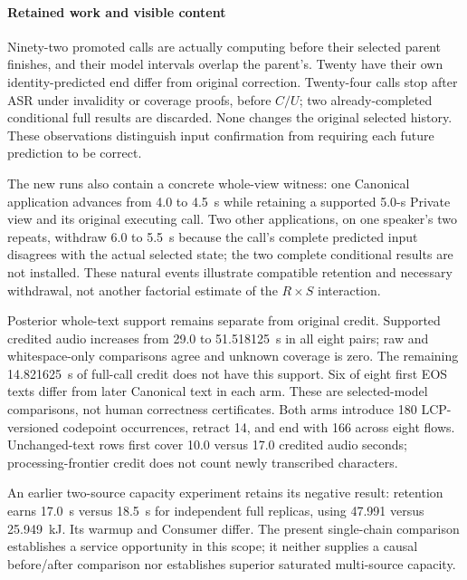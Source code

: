 \paragraph{Retained work and visible content}
Ninety-two promoted calls are actually computing before their selected
parent finishes, and their model intervals overlap the parent's. Twenty
have their own identity-predicted end differ from original correction.
Twenty-four calls stop after ASR under invalidity or coverage proofs,
before $C/U$; two
already-completed conditional full results are discarded. None changes
the original selected history. These observations distinguish input
confirmation from requiring each future prediction to be correct.

The new runs also contain a concrete whole-view witness: one Canonical
application advances from 4.0 to 4.5~s while retaining a supported 5.0-s
Private view and its original executing call. Two other applications,
on one speaker's two repeats, withdraw 6.0 to 5.5~s because the call's
complete predicted input disagrees with the actual selected state;
the two complete conditional results are not installed. These natural
events illustrate compatible retention and necessary withdrawal, not
another factorial estimate of the $R\times S$ interaction.

Posterior whole-text support remains separate from original credit.
Supported credited audio increases from 29.0 to 51.518125~s in all eight
pairs; raw and whitespace-only comparisons agree and unknown coverage
is zero. The remaining 14.821625~s of full-call credit does not have this
support. Six of eight first EOS texts differ from later Canonical text
in each arm. These are selected-model comparisons, not human correctness
certificates. Both arms introduce 180 LCP-versioned codepoint occurrences,
retract 14, and end with 166 across eight flows. Unchanged-text rows first
cover 10.0 versus 17.0 credited audio seconds; processing-frontier credit
does not count newly transcribed characters.

An earlier two-source capacity experiment retains its negative result:
retention earns 17.0~s versus 18.5~s for independent full replicas, using
47.991 versus 25.949~kJ. Its warmup and Consumer differ. The present
single-chain comparison establishes a service opportunity in this scope;
it neither supplies a causal before/after comparison nor establishes
superior saturated multi-source capacity.
